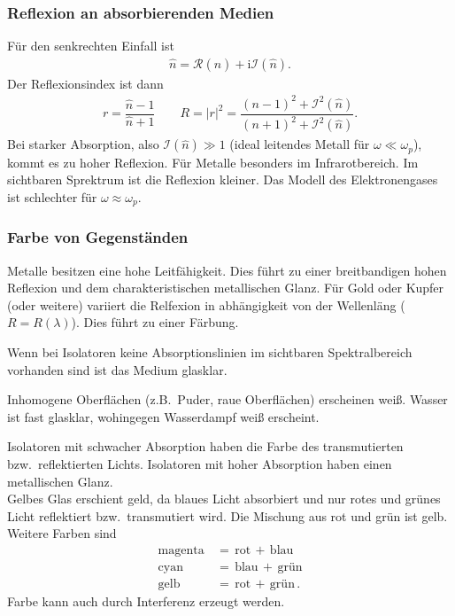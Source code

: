 \documentclass[a4paper,12pt]{article}
\numberwithin{equation}{section}
\begin{document}
\subsubsection{Reflexion an absorbierenden Medien}
Für den senkrechten Einfall ist 
\begin{align} 
        \hat{n}=\mathcal{R}\left(\hat{n}\right)+\text{i}\mathcal{I}\left(\hat{n}\right)
.\end{align} 
Der Reflexionsindex ist dann
\begin{align} 
        r=\dfrac{\hat{n}-1}{\hat{n}+1}\qquad R=|r|^2=\dfrac{\left(n-1\right)^2+\mathcal{I}^2\left(\hat{n}\right)}{\left(n+1\right)^2+\mathcal{I}^2\left(\hat{n}\right)}
.\end{align} 
Bei starker Absorption, also $\mathcal{I}\left(\hat{n}\right)\gg 1$ (ideal leitendes Metall für $\omega \ll \omega _p$), kommt es zu hoher Reflexion. Für Metalle besonders im Infrarotbereich. Im sichtbaren Sprektrum ist die Reflexion kleiner. Das Modell des Elektronengases ist schlechter für $\omega \approx \omega _p$.

\subsubsection{Farbe von Gegenständen}
Metalle besitzen eine hohe Leitfähigkeit. Dies führt zu einer breitbandigen hohen Reflexion und dem charakteristischen metallischen Glanz. Für Gold oder Kupfer (oder weitere) variiert die Relfexion in abhängigkeit von der Wellenläng ($R=R\left(\lambda \right)$). Dies führt zu einer Färbung.\par
Wenn bei Isolatoren keine Absorptionslinien im sichtbaren Spektralbereich vorhanden sind ist das Medium glasklar.\par
Inhomogene Oberflächen (z.B.\ Puder, raue Oberflächen) erscheinen weiß. Wasser ist fast glasklar, wohingegen Wasserdampf weiß erscheint.\par
Isolatoren mit schwacher Absorption haben die Farbe des transmutierten bzw.\ reflektierten Lichts. Isolatoren mit hoher Absorption haben einen metallischen Glanz.\\\indent
Gelbes Glas erschient geld, da blaues Licht absorbiert und nur rotes und grünes Licht reflektiert bzw.\ transmutiert wird. Die Mischung aus rot und grün ist gelb. Weitere Farben sind
\begin{align} 
        \,\text{magenta}\,&=\,\text{rot}\,+\,\text{blau}\,\\
        \,\text{cyan}\,&=\,\text{blau}\,+\,\text{grün}\,\\
        \,\text{gelb}\,&=\,\text{rot}\,+\,\text{grün}\,
.\end{align} 
Farbe kann auch durch Interferenz erzeugt werden.
\end{document}
